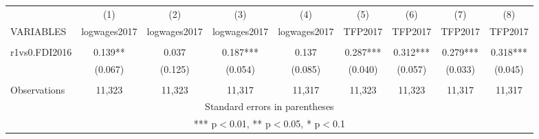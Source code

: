 \documentclass[]{article}
\begin{document}
\begin{tabular}{lcccccccc} \hline
 & (1) & (2) & (3) & (4) & (5) & (6) & (7) & (8) \\
VARIABLES & logwages2017 & logwages2017 & logwages2017 & logwages2017 & TFP2017 & TFP2017 & TFP2017 & TFP2017 \\ \hline
 &  &  &  &  &  &  &  &  \\
r1vs0.FDI2016 & 0.139** & 0.037 & 0.187*** & 0.137 & 0.287*** & 0.312*** & 0.279*** & 0.318*** \\
 & (0.067) & (0.125) & (0.054) & (0.085) & (0.040) & (0.057) & (0.033) & (0.045) \\
 &  &  &  &  &  &  &  &  \\
 Observations & 11,323 & 11,323 & 11,317 & 11,317 & 11,323 & 11,323 & 11,317 & 11,317 \\ \hline
\multicolumn{9}{c}{ Standard errors in parentheses} \\
\multicolumn{9}{c}{ *** p$<$0.01, ** p$<$0.05, * p$<$0.1} \\
\end{tabular}
\end{document}
